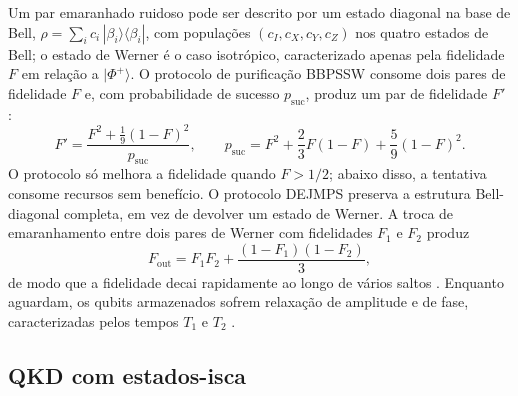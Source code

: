 \documentclass[12pt]{article}
\begin{document}
Um par emaranhado ruidoso pode ser descrito por um estado diagonal na base de
Bell, $\rho=\sum_i c_i\,|\beta_i\rangle\langle\beta_i|$, com populações
$(c_I,c_X,c_Y,c_Z)$ nos quatro estados de Bell; o estado de Werner
\cite{werner1989} é o caso isotrópico, caracterizado apenas pela fidelidade $F$
em relação a $|\Phi^+\rangle$. O protocolo de purificação BBPSSW consome dois
pares de fidelidade $F$ e, com probabilidade de sucesso $p_{\mathrm{suc}}$,
produz um par de fidelidade $F'$ \cite{bennett1996}:
\begin{equation}
F' = \frac{F^2 + \frac{1}{9}(1-F)^2}{p_{\mathrm{suc}}}, \qquad
p_{\mathrm{suc}} = F^2 + \frac{2}{3}F(1-F) + \frac{5}{9}(1-F)^2 .
\label{eq:bbpssw}
\end{equation}
O protocolo só melhora a fidelidade quando $F > 1/2$; abaixo disso, a tentativa
consome recursos sem benefício. O protocolo DEJMPS \cite{deutsch1996} preserva a
estrutura Bell-diagonal completa, em vez de devolver um estado de Werner. A
troca de emaranhamento entre dois pares de Werner com fidelidades $F_1$ e $F_2$
produz
\begin{equation}
F_{\mathrm{out}} = F_1F_2 + \frac{(1-F_1)(1-F_2)}{3},
\label{eq:swap}
\end{equation}
de modo que a fidelidade decai rapidamente ao longo de vários saltos
\cite{briegel1998,dur1999}. Enquanto aguardam, os qubits armazenados sofrem
relaxação de amplitude e de fase, caracterizadas pelos tempos $T_1$ e $T_2$
\cite{nielsen2010}.

\subsection{QKD com estados-isca}
\end{document}
